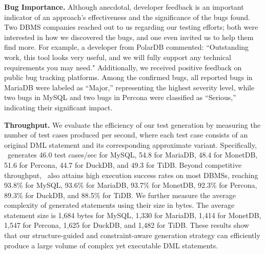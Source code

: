 \textbf{Bug Importance.}
Although anecdotal, developer feedback is an important indicator of an approach’s effectiveness and the significance of the bugs found. 
Two DBMS companies reached out to us regarding our testing efforts; both were interested in how we discovered the bugs, and one even invited us to help them find more. 
For example, a developer from PolarDB commented: ``Outstanding work, this tool looks very useful, and we will fully support any technical requirements you may need."
Additionally, we received positive feedback on public bug tracking platforms. 
Among the confirmed bugs, all reported bugs in MariaDB were labeled as ``Major,'' representing the highest severity level, while two bugs in MySQL and two bugs in Percona were classified as ``Serious,'' indicating their significant impact.

\textbf{Throughput.}
We evaluate the efficiency of our test generation by measuring the number of test cases produced per second, where each test case consists of an original DML statement and its corresponding approximate variant. 
Specifically, \toolname\ generates 46.0 test cases/sec for MySQL, 54.8 for MariaDB, 48.4 for MonetDB, 51.6 for Percona, 44.7 for DuckDB, and 49.3 for TiDB. 
Beyond competitive throughput, \toolname\ also attains high execution success rates on most DBMSs, reaching 93.8\% for MySQL, 93.6\% for MariaDB, 93.7\% for MonetDB, 92.3\% for Percona, 89.3\% for DuckDB, and 88.5\% for TiDB.
We further measure the average complexity of generated statements using their size in bytes. 
The average statement size is 1,684 bytes for MySQL, 1,330 for MariaDB, 1,414 for MonetDB, 1,547 for Percona, 1,625 for DuckDB, and 1,482 for TiDB. 
These results show that our structure-guided and constraint-aware generation strategy can efficiently produce a large volume of complex yet executable DML statements.

    


